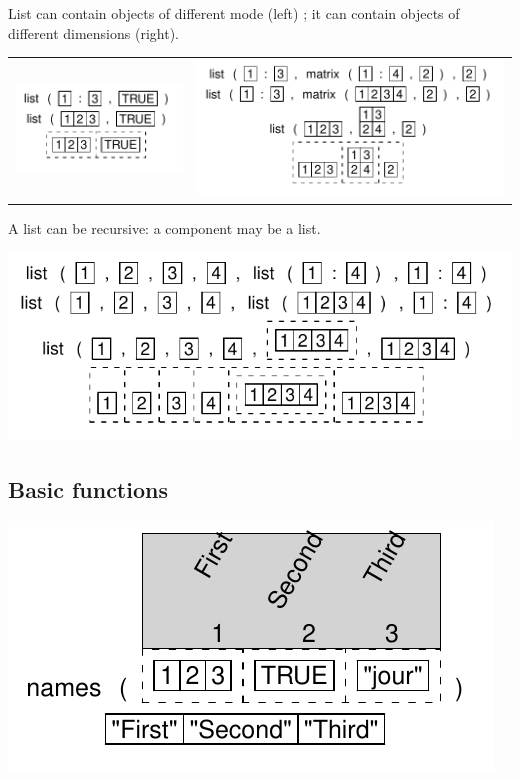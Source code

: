 \documentclass[pdflatex]{article}
\begin{document}
List can contain objects of different mode (left) ;
it can contain objects of different dimensions (right).

\begin{tabular}{cc}
\includegraphics{list_twotypes.pdf} & \includegraphics{list_matrix.pdf}
\end{tabular}

A list can be recursive: a component may be a list.

\includegraphics{list_complex.pdf}


\subsection{Basic functions}

\includegraphics{list_names}
\end{document}
